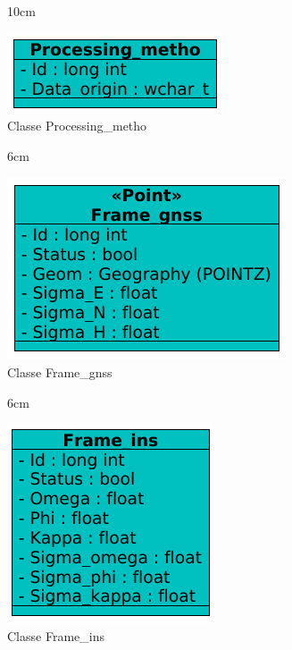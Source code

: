 \begin{figure}[!ht]{10cm}
  \caption{Classe Processing\_metho} \label{proces}
  \centering
  \includegraphics[width=0.5\hsize]{figuras/44.png}
\end{figure}

\begin{figure}[!ht]{6cm}
  \caption{Classe Frame\_gnss} \label{gnss}
  \centering
  \includegraphics[width=1\hsize]{figuras/1.png}
\end{figure}

\begin{figure}[!ht]{6cm}
  \caption{Classe Frame\_ins} \label{ins}
  \centering
  \includegraphics[width=0.65\hsize]{figuras/4.png}
\end{figure}


